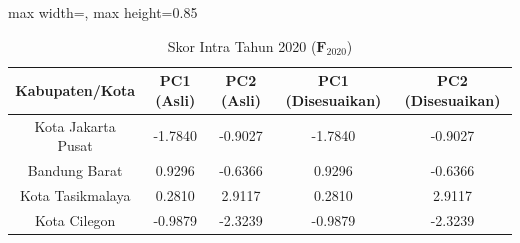 \begin{table}[H]
\centering
\caption{Skor Intra Tahun 2020 ($\mathbf{F}_{2020}$)} \makeatletter{}\makeatother
\begin{adjustbox}{max width=\textwidth, max height=0.85\textheight}
\begin{tabular}{|c|c|c|c|c|}
\hline
\textbf{Kabupaten/Kota} & \textbf{PC1 (Asli)} & \textbf{PC2 (Asli)} & \textbf{PC1 (Disesuaikan)} & \textbf{PC2 (Disesuaikan)} \\
\hline
Kota Jakarta Pusat & -1.7840 & -0.9027 & -1.7840 & -0.9027 \\
Bandung Barat & 0.9296 & -0.6366 & 0.9296 & -0.6366 \\
Kota Tasikmalaya & 0.2810 & 2.9117 & 0.2810 & 2.9117 \\
Kota Cilegon & -0.9879 & -2.3239 & -0.9879 & -2.3239 \\
\hline
\end{tabular}
\end{adjustbox}
\end{table}